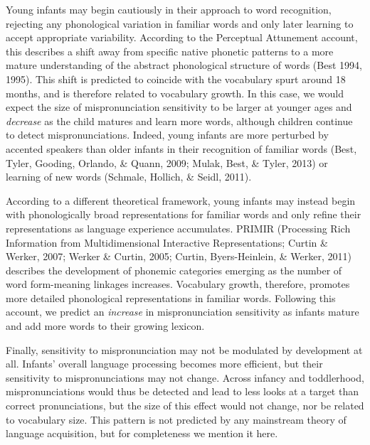 \documentclass[man]{apa6}
\theoremstyle{definition}
\theoremstyle{definition}
\theoremstyle{definition}
\theoremstyle{remark}
\begin{document}
Young infants may begin cautiously in their approach to word
recognition, rejecting any phonological variation in familiar words and
only later learning to accept appropriate variability. According to the
Perceptual Attunement account, this describes a shift away from specific
native phonetic patterns to a more mature understanding of the abstract
phonological structure of words (Best 1994, 1995). This shift is
predicted to coincide with the vocabulary spurt around 18 months, and is
therefore related to vocabulary growth. In this case, we would expect
the size of mispronunciation sensitivity to be larger at younger ages
and \emph{decrease} as the child matures and learn more words, although
children continue to detect mispronunciations. Indeed, young infants are
more perturbed by accented speakers than older infants in their
recognition of familiar words (Best, Tyler, Gooding, Orlando, \& Quann,
2009; Mulak, Best, \& Tyler, 2013) or learning of new words (Schmale,
Hollich, \& Seidl, 2011).

According to a different theoretical framework, young infants may
instead begin with phonologically broad representations for familiar
words and only refine their representations as language experience
accumulates. PRIMIR (Processing Rich Information from Multidimensional
Interactive Representations; Curtin \& Werker, 2007; Werker \& Curtin,
2005; Curtin, Byers-Heinlein, \& Werker, 2011) describes the development
of phonemic categories emerging as the number of word form-meaning
linkages increases. Vocabulary growth, therefore, promotes more detailed
phonological representations in familiar words. Following this account,
we predict an \emph{increase} in mispronunciation sensitivity as infants
mature and add more words to their growing lexicon.

Finally, sensitivity to mispronunciation may not be modulated by
development at all. Infants' overall language processing becomes more
efficient, but their sensitivity to mispronunciations may not change.
Across infancy and toddlerhood, mispronunciations would thus be detected
and lead to less looks at a target than correct pronunciations, but the
size of this effect would not change, nor be related to vocabulary size.
This pattern is not predicted by any mainstream theory of language
acquisition, but for completeness we mention it here.
\end{document}
